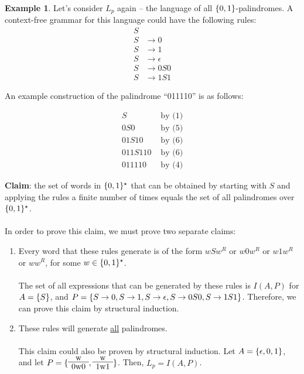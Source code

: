 \documentclass[]{article}
\DeclarePairedDelimiter{\set}{\lbrace}{\rbrace}
\theoremstyle{definition}
\newtheorem{ex}{Example}[section]
\begin{document}
    \begin{ex}
      Let's consider $L_p$ again -- the language of all $\set{0, 1}$-palindromes. A context-free grammar for this language could have the following rules:
      \begin{align}
        S& \\
        S &\to 0 \\
        S &\to 1 \\
        S &\to \epsilon \\
        S &\to 0S0 \\
        S &\to 1S1
      \end{align}
      \setcounter{equation}{0}

      An example construction of the palindrome ``011110'' is as follows:

      \begin{align*}
        S &\text{ by (1)} \\
        0S0 &\text{ by (5)} \\
        01S10 &\text{ by (6)} \\
        011S110 &\text{ by (6)} \\
        011110 &\text{ by (4)}
      \end{align*}

      \textbf{Claim}: the set of words in $\set{0, 1}^\star$ that can be obtained by starting with $S$ and applying the rules a finite number of times equals the set of all palindromes over $\set{0, 1}^\star$.
      \\ \\
      In order to prove this claim, we must prove two separate claims:
      \begin{enumerate}
        \item Every word that these rules generate is of the form $wSw^R$ or $w0w^R$ or $w1w^R$ or $ww^R$, for some $w \in \set{0, 1}^\star$.
        \\ \\
        The set of all expressions that can be generated by these rules is $I(A, P)$ for $A = \set{S}$, and $P = \set{ S \to 0, S \to 1, S \to \epsilon, S \to 0S0, S \to 1S1}$. Therefore, we can prove this claim by structural induction.
        \item These rules will generate \underline{all} palindromes.
        \\ \\
        This claim could also be proven by structural induction. Let $A = \set{\epsilon, 0, 1}$, and let $P = \set{ \AxiomC{w} \UnaryInfC{0w0} \DisplayProof, \AxiomC{w} \UnaryInfC{1w1} \DisplayProof }$. Then, $L_p = I(A, P)$.
      \end{enumerate}
    \end{ex}
\end{document}
